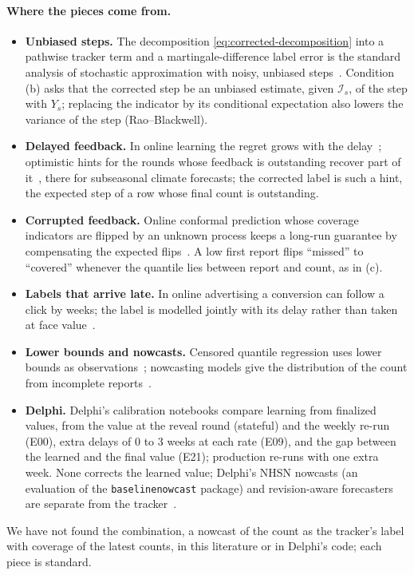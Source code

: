 \documentclass[11pt,a4paper]{article}
\theoremstyle{definition}
\theoremstyle{remark}
\begin{document}
\paragraph{Where the pieces come from.}
\begin{itemize}[leftmargin=*,itemsep=2pt]
\item \textbf{Unbiased steps.} The decomposition
\eqref{eq:corrected-decomposition} into a pathwise tracker term and a
martingale-difference label error is the standard analysis of stochastic
approximation with noisy, unbiased steps~\cite{robbins-monro,kushner-yin}.
Condition (b) asks that the corrected step be an unbiased estimate, given
$\mathcal I_s$, of the step with $Y_s$; replacing the indicator by its
conditional expectation also lowers the variance of the step
(Rao--Blackwell).
\item \textbf{Delayed feedback.} In online learning the regret grows with
the delay~\cite{joulani}; optimistic hints for the rounds whose feedback
is outstanding recover part of it~\cite{flaspohler}, there for subseasonal
climate forecasts; the corrected label is such a hint, the expected step of
a row whose final count is outstanding.
\item \textbf{Corrupted feedback.} Online conformal prediction whose
coverage indicators are flipped by an unknown process keeps a long-run
guarantee by compensating the expected flips~\cite{corrupted-feedback}. A
low first report flips ``missed'' to ``covered'' whenever the quantile
lies between report and count, as in (c).
\item \textbf{Labels that arrive late.} In online advertising a
conversion can follow a click by weeks; the label is modelled jointly with
its delay rather than taken at face value~\cite{chapelle}.
\item \textbf{Lower bounds and nowcasts.} Censored quantile regression
uses lower bounds as observations~\cite{portnoy}; nowcasting models give
the distribution of the count from incomplete
reports~\cite{lawless,hoehle-nowcasting,nobbs}.
\item \textbf{Delphi.} Delphi's calibration notebooks compare learning
from finalized values, from the value at the reveal round (stateful) and
the weekly re-run (E00), extra delays of 0 to 3 weeks at each rate (E09),
and the gap between the learned and the final value (E21); production
re-runs with one extra week. None corrects the learned value; Delphi's
NHSN nowcasts (an evaluation of the \texttt{baselinenowcast} package) and
revision-aware forecasters are separate from the
tracker~\cite{delphi-calibration}.
\end{itemize}
We have not found the combination, a nowcast of the count as the
tracker's label with coverage of the latest counts, in this literature or
in Delphi's code; each piece is standard.
\end{document}
